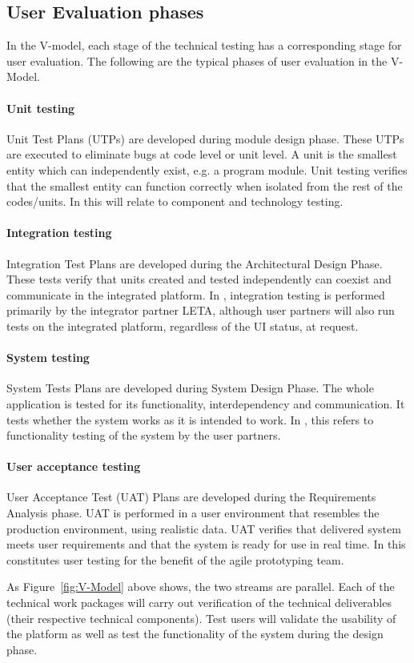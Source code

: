 \subsection{User Evaluation phases}
In the V-model, each stage of the technical testing has a corresponding stage for user evaluation. The following are the typical phases of user evaluation in the V-Model. 

\paragraph{Unit testing}
Unit Test Plans (UTPs) are developed during module design phase. These UTPs are executed to eliminate bugs at code level or unit level. A unit is the smallest entity which can independently exist, e.g. a program module. Unit testing verifies that the smallest entity can function correctly when isolated from the rest of the codes/units. In \SUMMA this will relate to component and technology testing.

\paragraph{Integration testing}
Integration Test Plans are developed during the Architectural Design Phase. These tests verify that units created and tested independently can coexist and communicate in the integrated platform. In \SUMMA, integration testing is performed primarily by the integrator partner LETA, although user partners will also run tests on the integrated platform, regardless of the UI status, at request. 

\paragraph{System testing}
System Tests Plans are developed during System Design Phase. The whole application is tested for its functionality, interdependency and communication. It tests whether the system works as it is intended to work. In \SUMMA, this refers to functionality testing of the system by the user partners.

\paragraph{User acceptance testing}
User Acceptance Test (UAT) Plans are developed during the Requirements Analysis phase. UAT is performed in a user environment that resembles the production environment, using realistic data. UAT verifies that delivered system meets user requirements and that the system is ready for use in real time. In \SUMMA this constitutes user testing for the benefit of the agile prototyping team. 

As Figure~\ref{fig:V-Model} above shows, the two streams are  parallel. Each of the technical work packages will carry out verification of the technical deliverables (their respective technical components). Test users will validate the usability of the platform as well as test the functionality of the system during the design phase.
